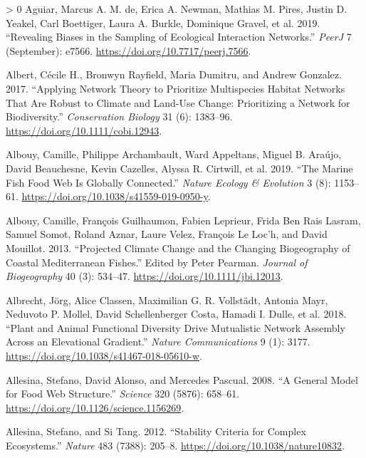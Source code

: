 \documentclass[11pt]{article}
\newlength{\cslhangindent}
\newenvironment{CSLReferences}[3] %
 {%
  \setlength{\parindent}{0pt}
  \ifodd #1 \everypar{\setlength{\hangindent}{\cslhangindent}}\ignorespaces\fi
  \ifnum #2 > 0
  \setlength{\parskip}{#2\baselineskip}
  \fi
 }%
 {}
\begin{document}
\hypertarget{refs}{}
\begin{CSLReferences}{1}{0}
\leavevmode\hypertarget{ref-deAguiar2019RevBia}{}%
Aguiar, Marcus A. M. de, Erica A. Newman, Mathias M. Pires, Justin D.
Yeakel, Carl Boettiger, Laura A. Burkle, Dominique Gravel, et al. 2019.
{``Revealing Biases in the Sampling of Ecological Interaction
Networks.''} \emph{PeerJ} 7 (September): e7566.
\url{https://doi.org/10.7717/peerj.7566}.

\leavevmode\hypertarget{ref-Albert2017AppNet}{}%
Albert, Cécile H., Bronwyn Rayfield, Maria Dumitru, and Andrew Gonzalez.
2017. {``Applying Network Theory to Prioritize Multispecies Habitat
Networks That Are Robust to Climate and Land-Use Change: Prioritizing a
Network for Biodiversity.''} \emph{Conservation Biology} 31 (6):
1383--96. \url{https://doi.org/10.1111/cobi.12943}.

\leavevmode\hypertarget{ref-Albouy2019MarFis}{}%
Albouy, Camille, Philippe Archambault, Ward Appeltans, Miguel B. Araújo,
David Beauchesne, Kevin Cazelles, Alyssa R. Cirtwill, et al. 2019.
{``The Marine Fish Food Web Is Globally Connected.''} \emph{Nature
Ecology \& Evolution} 3 (8): 1153--61.
\url{https://doi.org/10.1038/s41559-019-0950-y}.

\leavevmode\hypertarget{ref-Albouy2013ProCli}{}%
Albouy, Camille, François Guilhaumon, Fabien Leprieur, Frida Ben Rais
Lasram, Samuel Somot, Roland Aznar, Laure Velez, François Le Loc'h, and
David Mouillot. 2013. {``Projected Climate Change and the Changing
Biogeography of Coastal Mediterranean Fishes.''} Edited by Peter
Pearman. \emph{Journal of Biogeography} 40 (3): 534--47.
\url{https://doi.org/10.1111/jbi.12013}.

\leavevmode\hypertarget{ref-Albrecht2018PlaAni}{}%
Albrecht, Jörg, Alice Classen, Maximilian G. R. Vollstädt, Antonia Mayr,
Neduvoto P. Mollel, David Schellenberger Costa, Hamadi I. Dulle, et al.
2018. {``Plant and Animal Functional Diversity Drive Mutualistic Network
Assembly Across an Elevational Gradient.''} \emph{Nature Communications}
9 (1): 3177. \url{https://doi.org/10.1038/s41467-018-05610-w}.

\leavevmode\hypertarget{ref-Allesina2008GenMod}{}%
Allesina, Stefano, David Alonso, and Mercedes Pascual. 2008. {``A
General Model for Food Web Structure.''} \emph{Science} 320 (5876):
658--61. \url{https://doi.org/10.1126/science.1156269}.

\leavevmode\hypertarget{ref-Allesina2012StaCri}{}%
Allesina, Stefano, and Si Tang. 2012. {``Stability Criteria for Complex
Ecosystems.''} \emph{Nature} 483 (7388): 205--8.
\url{https://doi.org/10.1038/nature10832}.


\end{CSLReferences}
\end{document}
